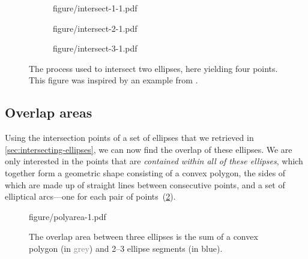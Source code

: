 \documentclass[
  oneside,
  openany,
  numbers=noendperiod,
  parskip=half,
  bibliography=totoc
]{scrbook}\usepackage[]{graphicx}\usepackage{xcolor}
\begin{document}
\begin{figure}[thbp]
\begin{subfigure}[t]{0.32\linewidth}
figure/intersect-1-1.pdf
\end{subfigure}
\hfill
\begin{subfigure}[t]{0.32\linewidth}
figure/intersect-2-1.pdf
\end{subfigure}
\hfill
\begin{subfigure}[t]{0.32\linewidth}
figure/intersect-3-1.pdf
\end{subfigure}
\caption{The process used to intersect two ellipses, here
yielding four points. This figure was inspired by an example from
\citet{Richter-Gebert_2011}.}
\label{fig:intersection}
\end{figure}

\subsection{Overlap areas}
\label{sec:overlap-areas}

Using the intersection points of a set of ellipses that we retrieved in
\cref{sec:intersecting-ellipses}, we can now find the
overlap of these ellipses. We are only interested in the points that are \emph{contained
within all of these ellipses}, which together form a geometric shape consisting of a
convex polygon, the sides of which are made up of straight lines between
consecutive points, and a set of elliptical arcs---one for each
pair of points~(\cref{fig:polyarea}).

\begin{figure}[hbtp]
\caption{The overlap area between three ellipses is the sum of a convex
polygon (in \textcolor{Grey}{grey}) and 2--3 ellipse segments (in
\textcolor{SteelBlue4}{blue}).\label{fig:polyarea}}
figure/polyarea-1.pdf
\end{figure}
\end{document}
